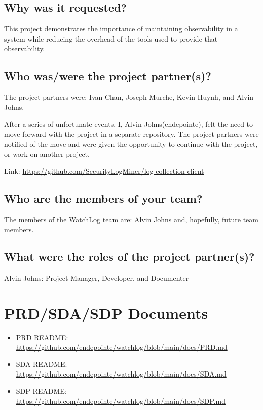 \documentclass{article}
\begin{document}
\subsection{Why was it requested?}

This project demonstrates the importance of maintaining observability in a system while reducing the overhead of the tools used to provide that observability.

\subsection{Who was/were the project partner(s)?}

The project partners were: Ivan Chan, Joseph Murche, Kevin Huynh, and Alvin Johns.\vspace{0.25cm}

After a series of unfortunate events, I, Alvin Johns(endepointe), felt the need to move forward with the project in a separate repository. The project partners were notified of the move and were given the opportunity to continue with the project, or work on another project.\vspace{0.25cm}

Link: \url{https://github.com/SecurityLogMiner/log-collection-client}

\subsection{Who are the members of your team?}

The members of the WatchLog team are: Alvin Johns and, hopefully, future team members.

\subsection{What were the roles of the project partner(s)?}

Alvin Johns: Project Manager, Developer, and Documenter

\newpage

\section{PRD/SDA/SDP Documents}

\begin{itemize}
    \item PRD README: \url{https://github.com/endepointe/watchlog/blob/main/docs/PRD.md}
    \item SDA README: \url{https://github.com/endepointe/watchlog/blob/main/docs/SDA.md}
    \item SDP README: \url{https://github.com/endepointe/watchlog/blob/main/docs/SDP.md}
\end{itemize}
\end{document}

